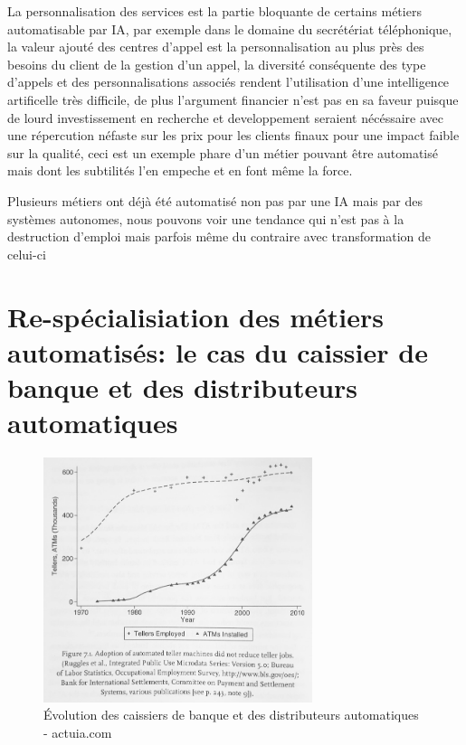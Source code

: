         La personnalisation des services est la partie bloquante de certains métiers 
        automatisable par IA, par exemple dans le domaine du secrétériat téléphonique,
        la valeur ajouté des centres d'appel est la personnalisation au plus près 
        des besoins du client de la gestion d'un appel, la diversité conséquente 
        des type d'appels et des personnalisations associés rendent l'utilisation 
        d'une intelligence artificelle très difficile, de plus l'argument financier 
        n'est pas en sa faveur puisque de lourd investissement en recherche et developpement
        seraient nécéssaire avec une répercution néfaste sur les prix pour les clients finaux 
        pour une impact faible sur la qualité, ceci est un exemple phare 
        d'un métier pouvant être automatisé mais dont les subtilités l'en empeche et 
        en font même la force.

        Plusieurs métiers ont déjà été automatisé non pas par une IA mais par des systèmes 
        autonomes, nous pouvons voir une tendance qui n'est pas à la destruction 
        d'emploi mais parfois même du contraire avec transformation de celui-ci\newline

        
        \section{Re-spécialisiation des métiers automatisés: le cas du caissier
        de banque et des distributeurs automatiques}

        \begin{figure}[H]
            \centering
            \includegraphics[width=0.7\textwidth]{Images/bankteller}
            \caption{Évolution des caissiers de banque et des distributeurs automatiques - actuia.com}
            \label{fig:banktellerevolution}
        \end{figure}


